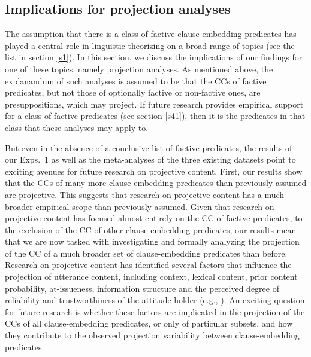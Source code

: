 \documentclass[11pt,fleqn]{article}
\newcommand{\6}{\mbox{$[\hspace*{-.6mm}[$}}
\newcommand{\9}{\mbox{$]\hspace*{-.6mm}]$}}
\begin{document}
\subsection{Implications for projection analyses}\label{s43}

The assumption that there is a class of factive clause-embedding predicates has played a central role in linguistic theorizing on a broad range of topics (see the list in section \ref{s1}). In this section, we discuss the implications of our findings for one of these topics, namely projection analyses. As mentioned above, the explanandum of such analyses is assumed to be that the CCs of factive predicates, but not those of optionally factive or non-factive ones, are presuppositions, which may project. If future research provides empirical support for a class of factive predicates (see section \ref{s41}), then it is the predicates in that class that these analyses may apply to.  

But even in the absence of a conclusive list of factive predicates, the results of our Exps.~1 as well as the meta-analyses of the three existing datasets point to exciting avenues for future research on projective content. First, our results show that the CCs of many more clause-embedding predicates than previously assumed are projective. This suggests that research on projective content has a much broader empirical scope than previously assumed. Given that research on projective content has focused almost entirely on the CC of  factive predicates, to the exclusion of the CC of other clause-embedding predicates, our results mean that we are now tasked with investigating and formally analyzing the projection of the CC of a much broader set of clause-embedding predicates than before. Research on projective content has identified several factors that influence the projection of utterance content, including context, lexical content, prior content probability, at-issueness, information structure and the perceived degree of reliability and trustworthiness of the attitude holder (e.g., \citealt{gazdar79a,gazdar79b,beaver-belly,schlenker10,brst-salt10,best-question,abrusan2011,abrusan2016,anand-hacquard2014,cummins-rohde2015,djaerv-bacovcin-salt27,mahler-etal2020,mahler2020,tonhauser-salt26,tonhauser-guarani-variability,tbd-variability,tonhauser-etal-sub23,degen-tonhauser-openmind}). An exciting question for future research is whether these factors are implicated in the projection of the CCs of all clause-embedding predicates, or only of particular subsets, and how they contribute to the observed projection variability between clause-embedding predicates.
\end{document}
